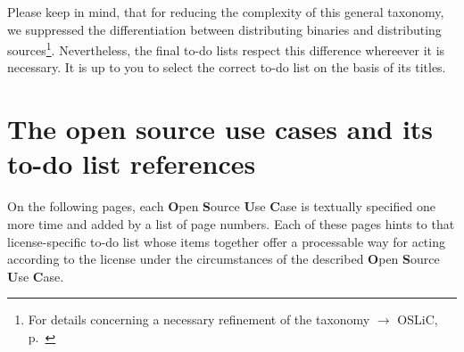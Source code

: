 Please keep in mind, that for reducing the complexity of this general taxonomy,
we suppressed the differentiation between distributing binaries and distributing
sources\footnote{For details concerning a necessary refinement of the taxonomy
$\rightarrow$ OSLiC, p.\ \pageref{sec:SourceBinaryDifference}}. Nevertheless,
the final to-do lists respect this difference whereever it is necessary. It is
up to you to select the correct to-do list on the basis of its titles.

\section{The open source use cases and its to-do list references}

On the following pages, each \textbf{O}pen \textbf{S}ource \textbf{U}se
\textbf{C}ase is textually specified one more time and added by a list of page
numbers. Each of these pages hints to that license-specific to-do list whose
items together offer a processable way for acting according to the license under
the circumstances of the described \textbf{O}pen \textbf{S}ource \textbf{U}se
\textbf{C}ase.

